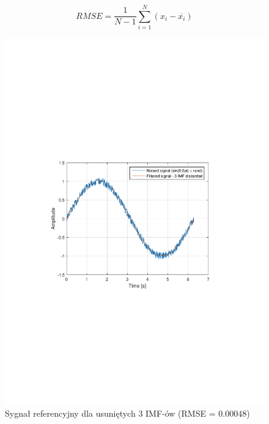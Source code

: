 \begin{equation}
    RMSE = \frac{1}{N-1}\sum_{i=1}^{N}(x_i-\overline{x_i})
    \label{equ:rmse}
\end{equation}

\begin{figure}[!htb]
    \begin{center}
        \includegraphics[width=13cm,trim=3cm 9cm 4cm 9cm,clip]
        {../img/sin_rmse3.pdf}
    \end{center}
    \caption{Sygnał referencyjny dla usuniętych 3 IMF-ów (RMSE = $0.00048$)}
    \label{rys:sin_rmse3}
\end{figure}

\newpage

